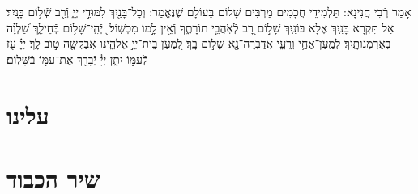 \documentclass[twoside, openany, parskip=half, 11pt]{book}
\begin{document}
\vspace{-.3\baselineskip}
 אָמַר רְֿבִי חֲנִינָא: תַּלְמִידֵי חֲכָמִים מַרְבִּים שָׁלוֹם בָּעוֹלָם שֶׁנֶּאֱמַר: וְכׇל־בָּנַ֖יִךְ לִמּוּדֵ֣י יְיָ֑ וְֿרַ֖ב שְֿׁל֥וֹם בָּנָֽיִךְ׃ אַל תִּקְרָא בָּנַֽיִךְ אֶלָּא בּוֹנַֽיִךְ שָׁל֣וֹם רָ֭ב לְֿאֹֽהֲבֵ֣י תוֹרָתֶ֑ךָ וְֿאֵ֖ין לָ֣מוֹ מִכְשֽׁוֹל׃  ֖ יְֿהִֽי־שָׁל֥וֹם בְּֿחֵילֵ֑ךְ שַׁ֝לְוָ֗ה בְּֿאַרְמְֿנוֹתָֽיִךְ׃ לְֿמַֽעַן־אַחַ֥י וְֿרֵעָ֑י אֲדַבְּֿרָה־נָּ֖א שָׁל֣וֹם בָּֽךְ׃ לְֿ֭מַעַן בֵּית־יְיָ֣ אֱלֹהֵ֑ינוּ אֲבַקְשָׁ֖ה ט֣וֹב לָֽךְ׃ יְיָ֗ עֹ֖ז לְֿעַמּ֣וֹ יִתֵּ֑ן יְיָ֓ יְֿבָרֵ֖ךְ אֶת־עַמּ֣וֹ בַֿשָּׁלֽוֹם׃

\rabbiskaddish

\section*{ עלינו }

\aleinu



\clearpage

\vspace{-1\baselineskip}
\section*{ שיר הכבוד }
\label{shir_shel_shabbos}
\end{document}
